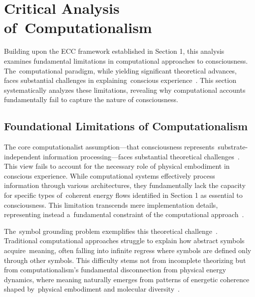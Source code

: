 \section{Critical Analysis of~Computationalism}

Building upon the ECC framework established in Section 1, this analysis examines fundamental limitations in computational approaches to consciousness. The~computational paradigm, while yielding significant theoretical advances, faces substantial challenges in explaining~conscious experience~\cite{piccinini2020neurocognitive,anderson2024physical}. This section systematically analyzes these limitations, revealing why computational accounts fundamentally fail to capture the nature of consciousness.

\subsection*{Foundational Limitations of Computationalism}

The core computationalist assumption—that consciousness represents~substrate-independent information processing—faces substantial theoretical challenges~\cite{fodor2000mind,piccinini2013neural}. This view fails to account for the necessary role of physical embodiment in conscious experience. While computational systems effectively process information through various architectures, they fundamentally lack the capacity for specific types of~coherent energy flows identified in Section 1 as essential to consciousness. This limitation transcends mere implementation details, representing instead a~fundamental constraint of the computational approach~\cite{dreyfus1992computers,butlin2023consciousnessartificialintelligenceinsights}.

The~symbol grounding problem exemplifies this theoretical challenge~\cite{harnad1990symbol,juarrero2023context}. Traditional computational approaches struggle to explain how abstract symbols acquire~meaning, often falling into infinite regress where symbols are defined only through other symbols. This difficulty stems not from incomplete theorizing but from computationalism's fundamental disconnection from physical energy dynamics, where meaning naturally emerges from patterns of energetic coherence shaped by~physical embodiment and molecular diversity~\cite{levin2019computational,gershman2023molecular}.

